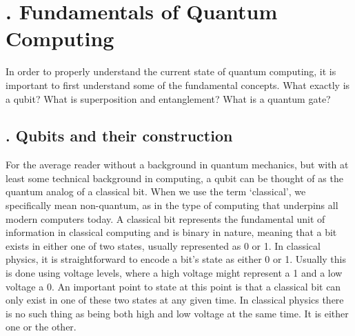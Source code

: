 \documentclass{elbioimp2}
\begin{document}


\section{. Fundamentals of Quantum Computing}
In order to properly understand the current state of quantum computing, it is important to first understand
some of the fundamental concepts. What exactly is a qubit? What is superposition and entanglement? What is a quantum gate?

\subsection{. Qubits and their construction}
For the average reader without a background in quantum mechanics, but with at least some technical background in computing,
a qubit can be thought of as the quantum analog of a classical bit. When we use the term `classical', we specifically mean 
non-quantum, as in the type of computing that underpins all modern computers today. A classical bit represents the fundamental 
unit of information in classical computing and is binary in nature, meaning that a bit exists in either one of two states, usually
represented as 0 or 1. In classical physics, it is straightforward to encode a bit's state as either 0 or 1. Usually this is done
using voltage levels, where a high voltage might represent a 1 and a low voltage a 0. An important point to state at this point
is that a classical bit can only exist in one of these two states at any given time. In classical physics there is no such thing as being both high and low voltage at the same time. It is either one or the other.
\end{document}
